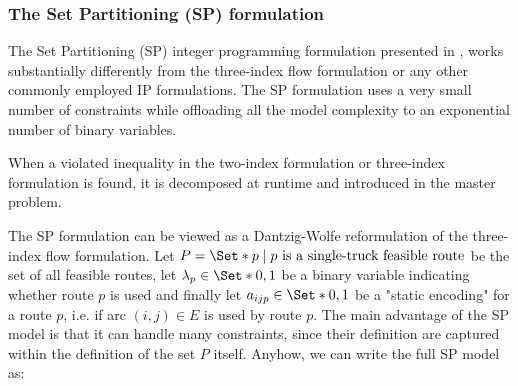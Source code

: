 \begin{comment}
\cite{jepsen2011}
Although the main focus of this thesis is exact solution methods, it is impor-
tant to remember that in real life the computational time needed to find the
optimal solution is not always available therefore it is important that the
exact solution algorithms can find good solutions within reasonable time.
Danna and Le Pape [18] have shown how to integrate the Branch-and-Price
algorithm with a local search framework. This integration helps the bcp
algorithm with finding good integer solutions in the early stages of the al-
gorithm. The method has show to result in reasonable good solutions for
the vrptw. Prescott-Gagnon et al. [55] have improved the heuristic ap-
proach for bcp algorithms further by integrating the bcp algorithm with
large neighbourhood search. For bac algorithms methods such as local
branching introduced by Fischetti and Lodi [28] and the feasibility pump
introduced by Fischetti et al. [29] can be used to find fast and good solu-
tions. The main benefit of the exact solution approach is that it provides
both an upper and lower bound.
Though when a fast good solution is needed a heuristics such as the
adaptive large scale neighbourhood search by Pisinger and Ropke [54] for
cvrp, vrptw and many other Vehicle Routing variants or the local search
heuristic by Zachariadis and Kiranoudis [65] are preferable.
\end{comment}

\subsubsection{The Set Partitioning (SP) formulation}
\label{sec:intro-set-partition-formulation}

The Set Partitioning (SP) integer programming formulation presented in \textcite{balinski1964},
works substantially differently from the three-index flow formulation or any other commonly employed IP formulations.
The SP formulation uses a very small number of constraints while offloading all the model complexity to an exponential number of binary variables.

When a violated inequality in the two-index formulation or three-index formulation is found, it is decomposed at runtime and introduced in the master problem.

The SP formulation can be viewed as a Dantzig-Wolfe reformulation \parencite{dantzig1960} of the three-index flow formulation.
Let $P = \Set*{p \mid p\ \text{is a single-truck feasible route}}$ be the set of all feasible routes,
let $\lambda_p \in \Set*{0, 1}$ be a binary variable indicating whether route $p$ is used
and finally let $a_{ijp} \in \Set*{0, 1}$ be a "static encoding" for a route $p$, i.e. if arc $(i, j) \in E$ is used by route $p$.
The main advantage of the SP model is that it can handle many constraints, since their definition are captured within the definition of the set $P$ itself.
Anyhow, we can write the full SP model as:


